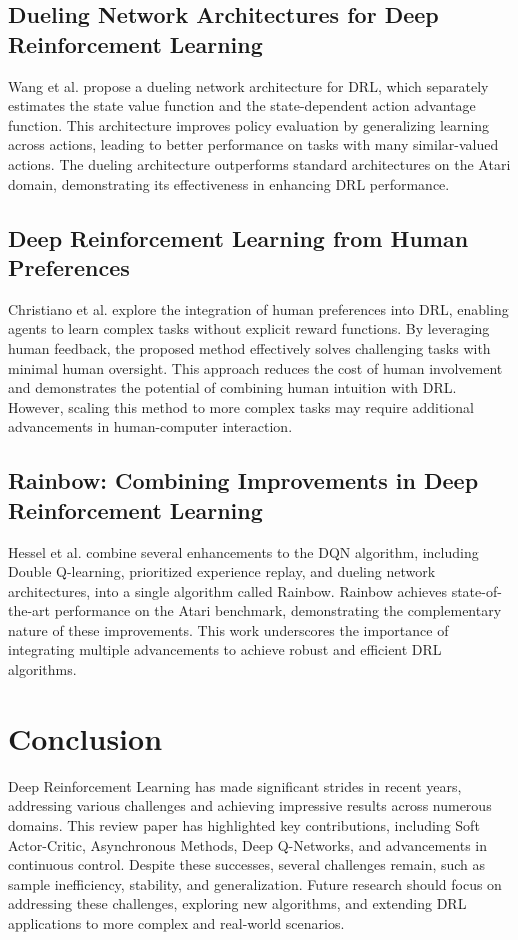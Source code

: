 \documentclass[12pt]{article}
\begin{document}
\subsection{Dueling Network Architectures for Deep Reinforcement Learning}
Wang et al. \cite{wang2016dueling} propose a dueling network architecture for DRL, which separately estimates the state value function and the state-dependent action advantage function. This architecture improves policy evaluation by generalizing learning across actions, leading to better performance on tasks with many similar-valued actions. The dueling architecture outperforms standard architectures on the Atari domain, demonstrating its effectiveness in enhancing DRL performance.

\subsection{Deep Reinforcement Learning from Human Preferences}
Christiano et al. \cite{christiano2017deep} explore the integration of human preferences into DRL, enabling agents to learn complex tasks without explicit reward functions. By leveraging human feedback, the proposed method effectively solves challenging tasks with minimal human oversight. This approach reduces the cost of human involvement and demonstrates the potential of combining human intuition with DRL. However, scaling this method to more complex tasks may require additional advancements in human-computer interaction.

\subsection{Rainbow: Combining Improvements in Deep Reinforcement Learning}
Hessel et al. \cite{hessel2018rainbow} combine several enhancements to the DQN algorithm, including Double Q-learning, prioritized experience replay, and dueling network architectures, into a single algorithm called Rainbow. Rainbow achieves state-of-the-art performance on the Atari benchmark, demonstrating the complementary nature of these improvements. This work underscores the importance of integrating multiple advancements to achieve robust and efficient DRL algorithms.

\section{Conclusion}
Deep Reinforcement Learning has made significant strides in recent years, addressing various challenges and achieving impressive results across numerous domains. This review paper has highlighted key contributions, including Soft Actor-Critic, Asynchronous Methods, Deep Q-Networks, and advancements in continuous control. Despite these successes, several challenges remain, such as sample inefficiency, stability, and generalization. Future research should focus on addressing these challenges, exploring new algorithms, and extending DRL applications to more complex and real-world scenarios.
\end{document}
